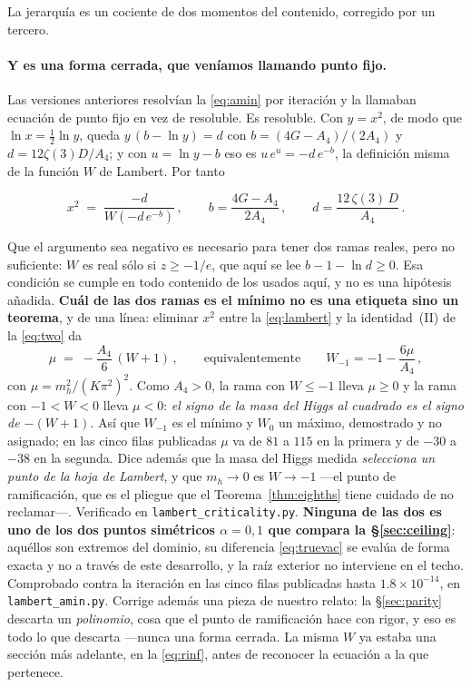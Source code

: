 \documentclass[11pt,a4paper]{article}
\newenvironment{keyeq}
  {\begin{center}\setlength{\fboxsep}{9pt}\setlength{\fboxrule}{0.8pt}%
   \begin{lrbox}{\keyeqbox}\begin{minipage}{0.88\textwidth}}
  {\end{minipage}\end{lrbox}%
   \fcolorbox{hdrblue!55}{hdrblue!6}{\usebox{\keyeqbox}}\end{center}}
\begin{document}
\noindent La jerarquía es un cociente de dos momentos del contenido, corregido por un tercero.

\paragraph{Y es una forma cerrada, que veníamos llamando punto fijo.} Las versiones anteriores
resolvían la \eqref{eq:amin} por iteración y la llamaban ecuación de punto fijo en vez de
resoluble. Es resoluble. Con $y=x^2$, de modo que $\ln x=\tfrac12\ln y$, queda $y\,(b-\ln y)=d$ con
$b=(4G-A_4)/(2A_4)$ y $d=12\zeta(3)D/A_4$; y con $u=\ln y-b$ eso es $u\,e^{u}=-d\,e^{-b}$, la
definición misma de la función $W$ de Lambert. Por tanto
\begin{keyeq}
\begin{equation}\label{eq:lambert}
  x^{2}\;=\;\frac{-d}{W\!\left(-d\,e^{-b}\right)}\,,\qquad
  b=\frac{4G-A_4}{2A_4}\,,\qquad d=\frac{12\,\zeta(3)\,D}{A_4}\,.
\end{equation}
\end{keyeq}
Que el argumento sea negativo es necesario para tener dos ramas reales, pero no suficiente: $W$ es
real sólo si $z\ge-1/e$, que aquí se lee $b-1-\ln d\ge0$. Esa condición se cumple en todo contenido
de los usados aquí, y no es una hipótesis añadida. \textbf{Cuál de las dos ramas es el mínimo no es una
etiqueta sino un teorema}, y de una línea: eliminar $x^2$ entre la \eqref{eq:lambert} y la
identidad~(II) de la \eqref{eq:two} da
\begin{equation}\label{eq:branchmu}
  \mu\;=\;-\frac{A_4}{6}\,(W+1)\,,\qquad\text{equivalentemente}\qquad W_{-1}=-1-\frac{6\mu}{A_4}\,,
\end{equation}
con $\mu=m_h^2/(K\pi^2)^2$. Como $A_4>0$, la rama con $W\le-1$ lleva $\mu\ge0$ y la rama con
$-1<W<0$ lleva $\mu<0$: \emph{el signo de la masa del Higgs al cuadrado es el signo de $-(W+1)$}.
Así que $W_{-1}$ es el mínimo y $W_{0}$ un máximo, demostrado y no asignado; en las cinco filas
publicadas $\mu$ va de $81$ a $115$ en la primera y de $-30$ a $-38$ en la segunda. Dice además
que la masa del Higgs medida \emph{selecciona un punto de la hoja de Lambert}, y que $m_h\to0$ es
$W\to-1$ ---el punto de ramificación, que es el pliegue que el Teorema~\ref{thm:eighths} tiene
cuidado de no reclamar---. Verificado en \texttt{lambert\_\allowbreak criticality.py}. \textbf{Ninguna de las dos es uno
de los dos puntos simétricos $\alpha=0,1$ que compara la \S\ref{sec:ceiling}}: aquéllos son
extremos del dominio, su diferencia \eqref{eq:truevac} se evalúa de forma exacta y no a través de
este desarrollo, y la raíz exterior no interviene en el techo. Comprobado
contra la iteración en las cinco filas publicadas hasta $1.8\times10^{-14}$, en
\texttt{lambert\_\allowbreak amin.py}. Corrige además una pieza de nuestro relato: la
\S\ref{sec:parity} descarta un \emph{polinomio}, cosa que el punto de ramificación hace con rigor,
y eso es todo lo que descarta ---nunca una forma cerrada. La misma $W$ ya estaba una sección más
adelante, en la \eqref{eq:rinf}, antes de reconocer la ecuación a la que pertenece.
\end{document}
